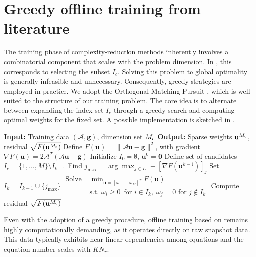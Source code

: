 \documentclass[onefignum,onetabnum]{siamart251104}
\newcommand{\bv}[1]{{\mathbf #1}}
\newcommand{\com}[1]{{{#1}_{\rm{c}}}} %
\newcommand{\Nr}{{N_r}}
\newcommand{\wei}{{\omega}} %
\newcommand{\vwei}{\bv{u}} %
\newcommand{\blsRevB}[1]{{{#1}}} %
\begin{document}
\section{Greedy offline training from literature} \label{sec:offline-training-standard}
The training phase of complexity-reduction methods inherently involves a combinatorial component that scales with the problem dimension. In , this corresponds to selecting the subset $I_c$. Solving this problem to global optimality is generally infeasible and unnecessary. Consequently, greedy strategies are employed in practice. We adopt the Orthogonal Matching Pursuit \cite{art:nguyen2019non,proc:blumensath2008gradient}, which is well-suited to the structure of our training problem. The core idea is to alternate between expanding the index set $I_c$ through a greedy search and computing optimal weights for the fixed set. A possible implementation is sketched in .


\begin{algorithm}[H]
\caption{Orthogonal Matching Pursuit for offline training}
\label{alg:OrthMatchPur}
\begin{algorithmic}[1]
\State \textbf{Input:} Training data $(\mathcal{A}, \bv{g})$, dimension set $\com{M}$
\State \textbf{Output:} Sparse weights $\vwei^{\com{M}}$, residual $\sqrt{F(\vwei^{\com{M}})}$
\State Define $F(\vwei) = \|\mathcal{A}\vwei - \bv{g}\|^2$, with gradient $\nabla F\blsRevB{(\vwei)} = 2\mathcal{A}^T(\mathcal{A}\vwei-\bv g)$
\State Initialize $I_0 = \emptyset$, $\vwei^0 = \bv{0}$
\For{$k = 1:\com{M}$}
    \State Define set of candidates $I_c = \{1,\ldots,M\}\setminus I_{k-1}$
    \State Find $j_{\max} = \arg\max_{j\in I_c} -[\nabla F(\vwei^{k-1})]_j$
    \State Set $I_k = I_{k-1}\cup\{j_{\max}\}$
\State $\begin{aligned}
\text{Solve } &  \min_{ \vwei=[\wei_1,\ldots,\wei_M]^T } F(\vwei) \\
& \text{s.t. }  \wei_i \ge 0 \, \text{ for } i \in I_k,\; \wei_j = 0 \text{ for }  j \notin I_k
\end{aligned}$
\EndFor
\State Compute residual $\sqrt{F(\vwei^{\com{M}})}$
\end{algorithmic}
\end{algorithm}


Even with the adoption of a greedy procedure, offline training based on  remains highly computationally demanding, as it operates directly on raw snapshot data. This data typically exhibits near-linear dependencies among equations and the equation number scales with $K\Nr$.
\end{document}
